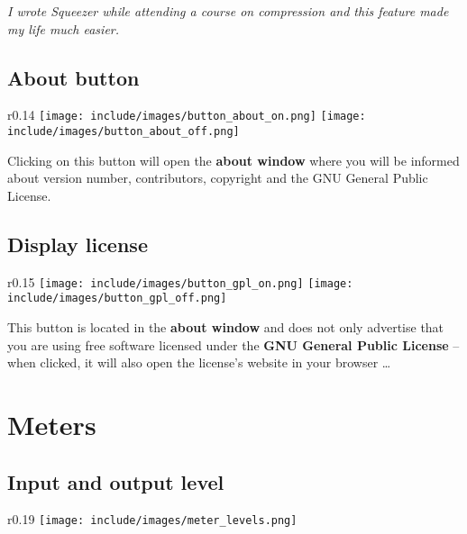 \emph{I wrote Squeezer while attending a course on compression and
  this feature made my life much easier.}

\section{About button}

\begin{wrapfigure}{r}{0.14\linewidth}
  \texttt{[image: include/images/button\_about\_on.png]}
  \newline \vspace{-0.9\baselineskip}
  \texttt{[image: include/images/button\_about\_off.png]}
\end{wrapfigure}

Clicking on this button will open the \textbf{about window} where you
will be informed about version number, contributors, copyright and the
GNU General Public License.

\section{Display license}

\begin{wrapfigure}{r}{0.15\linewidth}
  \texttt{[image: include/images/button\_gpl\_on.png]}
  \newline \vspace{-0.9\baselineskip}
  \texttt{[image: include/images/button\_gpl\_off.png]}
\end{wrapfigure}

This button is located in the \textbf{about window} and does not only
advertise that you are using free software licensed under the
\textbf{GNU General Public License} -- when clicked, it will also open
the license's website in your browser \dots

\chapter{Meters}
\label{chap:meters}

\section{Input and output level}

\begin{wrapfigure}{r}{0.19\linewidth}
\texttt{[image: include/images/meter\_levels.png]}
\end{wrapfigure}

